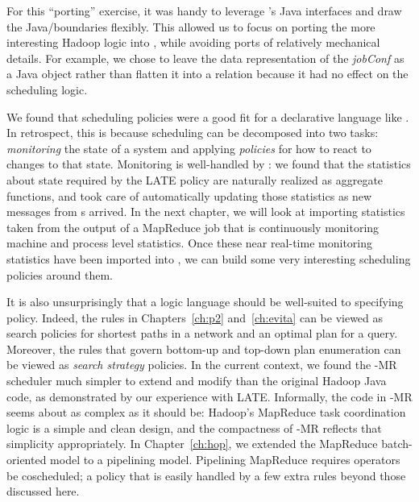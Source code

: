 For this ``porting'' exercise, it was handy to leverage \JOL's Java interfaces
and draw the Java/\OVERLOG boundaries flexibly.  This allowed us to focus on
porting the more interesting Hadoop logic into \OVERLOG, while avoiding ports of
relatively mechanical details.  For example, we chose to leave the data
representation of the \emph{jobConf} as a Java object rather than flatten it
into a relation because it had no effect on the scheduling logic.

We found that scheduling policies were a good fit for a declarative language
like \OVERLOG.  In retrospect, this is because scheduling can be decomposed
into two tasks: \emph{monitoring} the state of a system and applying
\emph{policies} for how to react to changes to that state.  Monitoring is
well-handled by \OVERLOG: we found that the statistics about {\TT} state
required by the LATE policy are naturally realized as aggregate functions, and
\JOL took care of automatically updating those statistics as new messages from
{\TT}s arrived.  In the next chapter, we will look at importing statistics
taken from the output of a MapReduce job that is continuously monitoring
machine and process level statistics.  Once these near real-time monitoring
statistics have been imported into \JOL, we can build some very interesting
scheduling policies around them.

It is also unsurprisingly that a logic language should be well-suited to
specifying policy.  Indeed, the rules in Chapters~\ref{ch:p2}
and~\ref{ch:evita} can be viewed as search policies for shortest paths in a
network and an optimal plan for a query.  Moreover, the rules that govern
bottom-up and top-down plan enumeration can be viewed as {\em search strategy}
policies.  In the current context, we found the \BOOM-MR scheduler much simpler
to extend and modify than the original Hadoop Java code, as demonstrated by our
experience with LATE\@.  Informally, the \OVERLOG code in \BOOM-MR seems about
as complex as it should be: Hadoop's MapReduce task coordination logic is a
simple and clean design, and the compactness of \BOOM-MR reflects that
simplicity appropriately.  In Chapter~\ref{ch:hop}, we extended the MapReduce
batch-oriented model to a pipelining model.  Pipelining MapReduce requires
operators be coscheduled; a policy that is easily handled by a few extra
\OVERLOG rules beyond those discussed here.






